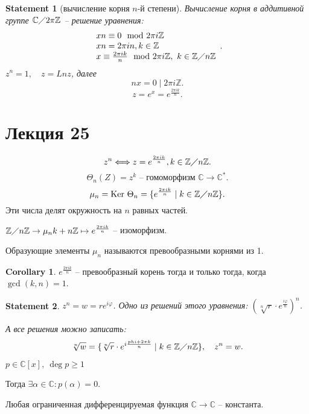\documentclass[11pt]{book}
\newcommand{\Z}{\mathbb{Z}}
\newcommand{\Cm}{\mathbb{C}}
\newcommand{\ke}{{\mathop{\text{\rm Ker}}}~}
\theoremstyle{definition}
\theoremstyle{plain}
\theoremstyle{plain}
\newtheorem*{st}{Statement}
\theoremstyle{definition}
\newtheorem*{cor}{Corollary}
\theoremstyle{remark}
\begin{document}
\begin{st}[вычисление корня $n$-й степени]
    Вычисление корня в аддитивной  группе $\Cm\diagup 2\pi\Z$  -- решение уравнения:
    \[
	\begin{array}{l}
	xn \equiv 0 \mod 2\pi i \Z\\
	xn = 2\pi i n, k \in  \Z \\
	x \equiv \frac{2\pi i k}{n} \mod 2\pi i \Z, ~ k \in  \Z\diagup n\Z
	\end{array}
    .\] 
    $z ^{n} = 1, \quad z = Ln z$,  далее
    \[
    nx = 0 \mid 2\pi i \Z
    .\] 
    \[
	z = e^{x}=e ^{\frac{2\pi ik}{n}}
    .\] 
\end{st}
\section{Лекция 25}
\[
    z^{n} \Longleftrightarrow z = e^{\frac{2 \pi  i k}{n}}, k \in  \Z \diagup n\Z
.\] 
\[
    \Theta_n (Z) = z^{k} \text{ -- гомоморфизм }  \Cm \to  \Cm^{*}
.\] 
\[
    \mu_n = \ke \Theta_n = \{e ^{ \frac{2\pi i k}{n}} \mid k \in  \Z\diagup n\Z\}
.\] 
Эти числа делят окружность на $ n$ равных частей.

$ \Z \diagup  n \Z \to  \mu_n\\
k + n\Z \mapsto e ^{\frac{2\pi i k}{n}}$ -- изоморфизм.
\begin{defn}
    Образующие элементы $ \mu_n$ называются превообразными корнями из 1.
\end{defn}
\begin{cor}
    $ e^{\frac{2\pi i k}{n}}$ -- превообразный корень тогда и только тогда, когда $ \gcd(k, n) = 1$.
\end{cor}
\begin{st}
    $ z^{n} = w = r e^{i \varphi }$.
    Одно из решений этого уравнения: $ \left( \sqrt[n]{r} \cdot e ^{\frac{i \varphi }{n}} \right)^{n} $.

    А все решения можно записать:
    \[
	\sqrt[n]{w} = \{\sqrt[n]{r} \cdot e ^{i \frac{phi  + 2 \pi k}{n}} \mid k \in  \Z\diagup n\Z\}, \quad z^{n} = w
    .\] 
\end{st}
\begin{thm}
    $ p \in  \Cm[x], ~ \deg p \ge 1$

    Тогда $ \exists \alpha  \in  \Cm: p( \alpha ) = 0$.
\end{thm}
\begin{thm}[Лиувилль]
    Любая ограниченная дифференцируемая функция $ \Cm \to  \Cm$ -- константа.
\end{thm}
\end{document}
